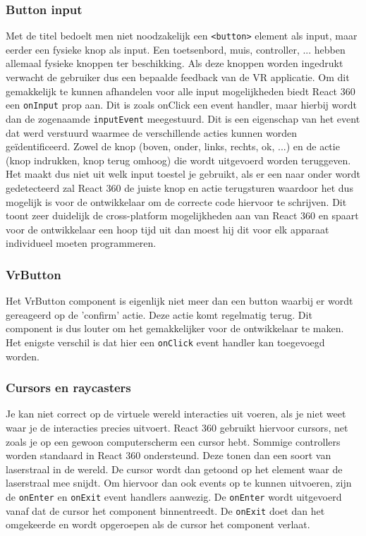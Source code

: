\subsubsection{Button input}
Met de titel bedoelt men niet noodzakelijk een \lstinline[basicstyle=\ttfamily\color{red}]|<button>| element als input, maar eerder een fysieke knop als input. Een toetsenbord, muis, controller, ... hebben allemaal fysieke knoppen ter beschikking. Als deze knoppen worden ingedrukt verwacht de gebruiker dus een bepaalde feedback van de VR applicatie. Om dit gemakkelijk te kunnen afhandelen voor alle input mogelijkheden biedt React 360 een \lstinline[basicstyle=\ttfamily\color{red}]|onInput| prop aan. Dit is zoals onClick een event handler, maar hierbij wordt dan de zogenaamde \lstinline[basicstyle=\ttfamily\color{red}]|inputEvent| meegestuurd. Dit is een eigenschap van het event dat werd verstuurd waarmee de verschillende acties kunnen worden geïdentificeerd. Zowel de knop (boven, onder, links, rechts, ok, ...) en de actie (knop indrukken, knop terug omhoog) die wordt uitgevoerd worden teruggeven. Het maakt dus niet uit welk input toestel je gebruikt, als er een naar onder wordt gedetecteerd zal React 360 de juiste knop en actie terugsturen waardoor het dus mogelijk is voor de ontwikkelaar om de correcte code hiervoor te schrijven. Dit toont zeer duidelijk de cross-platform mogelijkheden aan van React 360 en spaart voor de ontwikkelaar een hoop tijd uit dan moest hij dit voor elk apparaat individueel moeten programmeren.

\subsubsection{VrButton}
Het VrButton component is eigenlijk niet meer dan een button waarbij er wordt gereageerd op de 'confirm' actie. Deze actie komt regelmatig terug. Dit component is dus louter om het gemakkelijker voor de ontwikkelaar te maken. Het enigste verschil is dat hier een \lstinline[basicstyle=\ttfamily\color{red}]|onClick| event handler kan toegevoegd worden.

\subsubsection{Cursors en raycasters}
Je kan niet correct op de virtuele wereld interacties uit voeren, als je niet weet waar je de interacties precies uitvoert. React 360 gebruikt hiervoor cursors, net zoals je op een gewoon computerscherm een cursor hebt. Sommige controllers worden standaard in React 360 ondersteund. Deze tonen dan een soort van laserstraal in de wereld. De cursor wordt dan getoond op het element waar de laserstraal mee snijdt. Om hiervoor dan ook events op te kunnen uitvoeren, zijn de \lstinline[basicstyle=\ttfamily\color{red}]|onEnter| en \lstinline[basicstyle=\ttfamily\color{red}]|onExit| event handlers aanwezig. De \lstinline[basicstyle=\ttfamily\color{red}]|onEnter| wordt uitgevoerd vanaf dat de cursor het component binnentreedt. De \lstinline[basicstyle=\ttfamily\color{red}]|onExit| doet dan het omgekeerde en wordt opgeroepen als de cursor het component verlaat.

